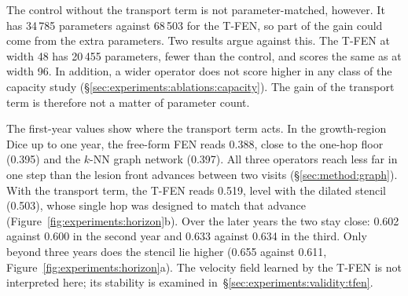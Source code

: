 The control without the transport term is not parameter-matched, however.
It has 34\,785 parameters against 68\,503 for the T-FEN, so part of the
gain could come from the extra parameters. Two results argue against this.
The T-FEN at width 48 has 20\,455 parameters, fewer than the control, and
scores the same as at width 96. In addition, a wider operator does not
score higher in any class of the capacity study
(\S\ref{sec:experiments:ablations:capacity}). The gain of the transport
term is therefore not a matter of parameter count.

The first-year values show where the transport term acts. In the
growth-region Dice up to one year, the free-form FEN reads 0.388, close to
the one-hop floor (0.395) and the $k$-NN graph network (0.397). All three
operators reach less far in one step than the lesion front advances between
two visits (\S\ref{sec:method:graph}). With the transport term, the T-FEN
reads 0.519, level with the dilated stencil (0.503), whose single hop was
designed to match that advance (Figure~\ref{fig:experiments:horizon}b).
Over the later years the two stay close: 0.602 against 0.600 in the second
year and 0.633 against 0.634 in the third. Only beyond three years does the
stencil lie higher (0.655 against 0.611,
Figure~\ref{fig:experiments:horizon}a). The velocity field learned by the
T-FEN is not interpreted here; its stability is examined
in~\S\ref{sec:experiments:validity:tfen}.

